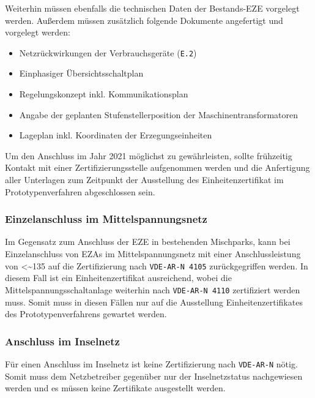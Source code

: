 Weiterhin müssen ebenfalls die technischen Daten der Bestands-\gls{EZE} vorgelegt werden. Außerdem müssen zusätzlich folgende Dokumente angefertigt und vorgelegt werden:

\begin{itemize}
	\item Netzrückwirkungen der Verbrauchsgeräte (\texttt{E.2})
	\item Einphasiger Übersichtsschaltplan
	\item Regelungskonzept inkl. Kommunikationsplan
	\item Angabe der geplanten Stufenstellerposition der Maschinentransformatoren
	\item Lageplan inkl. Koordinaten der Erzegungseinheiten
\end{itemize}

Um den Anschluss im Jahr \num{2021} möglichst zu gewährleisten, sollte frühzeitig Kontakt mit einer Zertifizierungsstelle aufgenommen werden und die Anfertigung aller Unterlagen zum Zeitpunkt der Ausstellung des Einheitenzertifikat im Prototypenverfahren abgeschlossen sein. \cite{MOEG2020}

\subsubsection{Einzelanschluss im Mittelspannungsnetz}

Im Gegensatz zum Anschluss der \gls{EZE} in bestehenden Mischparks, kann bei Einzelanschluss von \glspl{EZA} im Mittelspannungsnetz mit einer Anschlussleistung von \SI{<~135}{\kw} auf die Zertifizierung nach \texttt{VDE-AR-N \num{4105}} zurückgegriffen werden. In diesem Fall ist ein Einheitenzertifikat ausreichend, wobei die Mittelspannungsschaltanlage weiterhin nach \texttt{VDE-AR-N \num{4110}} zertifiziert werden muss. Somit muss in diesen Fällen nur auf die Ausstellung Einheitenzertifikates des Prototypenverfahrens gewartet werden.

\subsubsection{Anschluss im Inselnetz}

Für einen Anschluss im Inselnetz ist keine Zertifizierung nach \texttt{VDE-AR-N} nötig. Somit muss dem Netzbetreiber gegenüber nur der Inselnetzstatus nachgewiesen werden und es müssen keine Zertifikate ausgestellt werden.